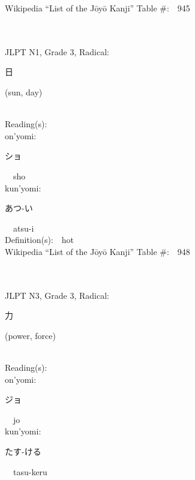 \begin{multicols}{2}
Wikipedia ``List of the J\=oy\=o Kanji'' Table \#:\ \ 945 \\
\ \ \\
{\fontsize{34pt}{40pt}  }\ \ \\  %
{JLPT N1, Grade 3, Radical:\ \ {\begin{CJK}{UTF8}{min} 日 \end{CJK}} (sun, day) } \\
Reading(s):\ \ \\
{\hspace*{1em}}on'yomi:\ \ \\
{\hspace*{2em}}{\begin{CJK}{UTF8}{min} ショ \end{CJK}}\ \ sho\ \ \\
{\hspace*{1em}}kun'yomi:\ \ \\
{\hspace*{2em}}{\begin{CJK}{UTF8}{min} あつ-い \end{CJK}}\ \ atsu-i\ \ \\
Definition(s):\ \ hot \\
Wikipedia ``List of the J\=oy\=o Kanji'' Table \#:\ \ 948 \\
\ \ \\
{\fontsize{34pt}{40pt}  }\ \ \\  %
{JLPT N3, Grade 3, Radical:\ \ {\begin{CJK}{UTF8}{min} 力 \end{CJK}} (power, force) } \\
Reading(s):\ \ \\
{\hspace*{1em}}on'yomi:\ \ \\
{\hspace*{2em}}{\begin{CJK}{UTF8}{min} ジョ \end{CJK}}\ \ jo\ \ \\
{\hspace*{1em}}kun'yomi:\ \ \\
{\hspace*{2em}}{\begin{CJK}{UTF8}{min} たす-ける \end{CJK}}\ \ tasu-keru\ \ \\

\end{multicols}
